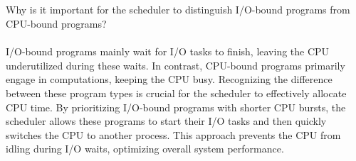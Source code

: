 \subsection*{}
Why is it important for the scheduler to distinguish I/O-bound programs from CPU-bound programs?
    \paragraph*{}
    I/O-bound programs mainly wait for I/O tasks to finish, leaving the CPU underutilized during these waits. In contrast, CPU-bound programs primarily engage in computations, keeping the CPU busy. Recognizing the difference between these program types is crucial for the scheduler to effectively allocate CPU time. By prioritizing I/O-bound programs with shorter CPU bursts, the scheduler allows these programs to start their I/O tasks and then quickly switches the CPU to another process. This approach prevents the CPU from idling during I/O waits, optimizing overall system performance.